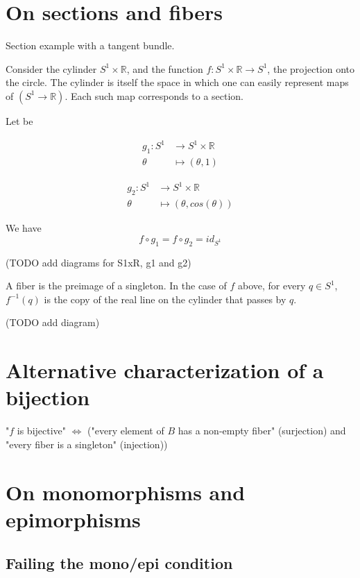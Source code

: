 \documentclass[12pt, letterpaper, twoside]{report}
\begin{document}
\section*{On sections and fibers}

Section example with a tangent bundle.

Consider the cylinder $S^1 \times \mathbb{R}$, and the function $f : S^1 \times \mathbb{R} \to S^1$, the projection onto the circle. The cylinder is itself the space in which one can easily represent maps of $(S^1 \to \mathbb{R})$. Each such map corresponds to a section.

Let be 

$$
\begin{aligned}
g_1 : S^1    & \longrightarrow  S^1 \times \mathbb{R} \\
      \theta & \longmapsto      (\theta, 1)
\end{aligned}
$$


$$
\begin{aligned}
g_2 : S^1    & \longrightarrow  S^1 \times \mathbb{R} \\
      \theta & \longmapsto      (\theta, cos(\theta))
\end{aligned}
$$

We have
$$f \circ g_1 = f \circ g_2 = id_{S^1}$$

(TODO add diagrams for S1xR, g1 and g2)

A fiber is the preimage of a singleton. In the case of $f$ above, for every $q \in S^1$, $f^{-1}({q})$ is the copy of the real line on the cylinder that passes by $q$.

(TODO add diagram)






\section*{Alternative characterization of a bijection}
"$f$ is bijective" $\Leftrightarrow$ ("every element of $B$ has a non-empty fiber" (surjection) and "every fiber is a singleton" (injection))





\section*{On monomorphisms and epimorphisms}

\subsection*{Failing the mono/epi condition}
\end{document}
